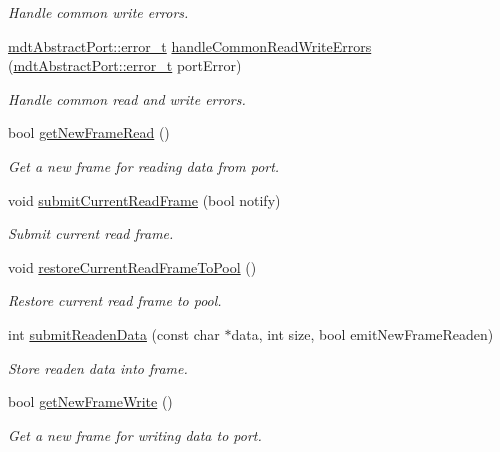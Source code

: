 \begin{DoxyCompactItemize}
\begin{DoxyCompactList}\small\item\em Handle common write errors. \end{DoxyCompactList}\item 
\hyperlink{classmdt_abstract_port_ad4121bb930c95887e77f8bafa065a85e}{mdtAbstractPort::error\_\-t} \hyperlink{classmdt_port_thread_helper_a92d8912aa908f18bd9b4d528c68b72aa}{handleCommonReadWriteErrors} (\hyperlink{classmdt_abstract_port_ad4121bb930c95887e77f8bafa065a85e}{mdtAbstractPort::error\_\-t} portError)
\begin{DoxyCompactList}\small\item\em Handle common read and write errors. \end{DoxyCompactList}\item 
bool \hyperlink{classmdt_port_thread_helper_aed853f4cedc143c62e7dad5e38ff4b8c}{getNewFrameRead} ()
\begin{DoxyCompactList}\small\item\em Get a new frame for reading data from port. \end{DoxyCompactList}\item 
void \hyperlink{classmdt_port_thread_helper_aec690fd203fa4dcaba36b5db781daabf}{submitCurrentReadFrame} (bool notify)
\begin{DoxyCompactList}\small\item\em Submit current read frame. \end{DoxyCompactList}\item 
void \hyperlink{classmdt_port_thread_helper_ac531bd67a8469e414fea4e5b16214d80}{restoreCurrentReadFrameToPool} ()
\begin{DoxyCompactList}\small\item\em Restore current read frame to pool. \end{DoxyCompactList}\item 
int \hyperlink{classmdt_port_thread_helper_ac433a4db4cbc8d6749a5f9fe4867b894}{submitReadenData} (const char $\ast$data, int size, bool emitNewFrameReaden)
\begin{DoxyCompactList}\small\item\em Store readen data into frame. \end{DoxyCompactList}\item 
bool \hyperlink{classmdt_port_thread_helper_a596b0616e64c089d5c877d86b0a75e9d}{getNewFrameWrite} ()
\begin{DoxyCompactList}\small\item\em Get a new frame for writing data to port. \end{DoxyCompactList}\item 

\end{DoxyCompactItemize}
